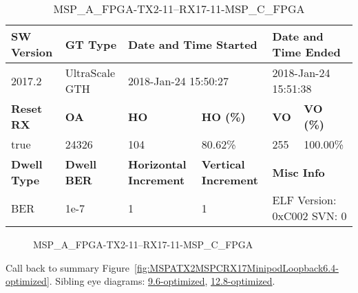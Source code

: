 \begin{table}[h]
\centering
\caption{MSP\_A\_FPGA-TX2-11--RX17-11-MSP\_C\_FPGA}
\label{tab:MSPAFPGATX211RX1711MSPCFPGA6.4-optimized}
\begin{tabular}{@{}|l|l|l|l|l|l|@{}}
\toprule
\textbf{SW Version}                & \textbf{GT Type}   & \multicolumn{2}{l|}{\textbf{Date and Time Started}}            & \multicolumn{2}{l|}{\textbf{Date and Time Ended}}        \\ \midrule
2017.2                       & UltraScale GTH          & \multicolumn{2}{l|}{2018-Jan-24 15:50:27}                   & \multicolumn{2}{l|}{2018-Jan-24 15:51:38}               \\ \midrule
\textbf{Reset RX}                  & \textbf{OA} & \textbf{HO}   & \textbf{HO (\%)} & \textbf{VO} & \textbf{VO (\%)} \\ \midrule
true & 24326        & 104          & 80.62\%        & 255        & 100.00\%       \\ \midrule
\textbf{Dwell Type}                & \textbf{Dwell BER} & \textbf{Horizontal Increment} & \textbf{Vertical Increment}    & \multicolumn{2}{l|}{\textbf{Misc Info}}                  \\ \midrule
BER                            & 1e-7        & 1        & 1           & \multicolumn{2}{l|}{ELF Version: 0xC002 SVN: 0}                         \\ \bottomrule
\end{tabular}
\end{table}

\begin{figure}[h]
\caption{MSP\_A\_FPGA-TX2-11--RX17-11-MSP\_C\_FPGA} \label{fig:MSPAFPGATX211RX1711MSPCFPGA6.4-optimized}
\end{figure}

Call back to summary Figure~\ref{fig:MSPATX2MSPCRX17MinipodLoopback6.4-optimized}.
Sibling eye diagrams: \hyperref[sec:MSPAFPGATX211RX1711MSPCFPGA9.6-optimized]{9.6-optimized}, \hyperref[sec:MSPAFPGATX211RX1711MSPCFPGA12.8-optimized]{12.8-optimized}.

\clearpage
\newpage

